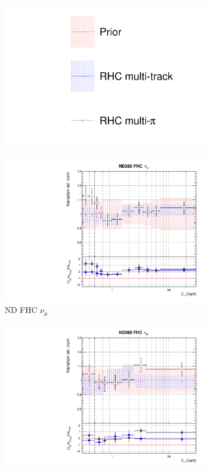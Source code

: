 \begin{figure}[t]
\centering
\begin{subfigure}{0.95\textwidth}
  \centering
  \includegraphics[width=0.24\linewidth]{figs/rhcmpdat28_leg}
  \caption{}
  \label{fig:}
\end{subfigure}
\begin{subfigure}{0.24\textwidth}
  \centering
  \includegraphics[width=0.95\linewidth]{figs/rhcmpdat28flux_0}
  \caption{ND FHC $\nu_{\mu}$}
  \label{fig:}
\end{subfigure}
\begin{subfigure}{0.24\textwidth}
  \centering
  \includegraphics[width=0.95\linewidth]{figs/rhcmpdat28flux_1}

\end{subfigure}
\end{figure}
